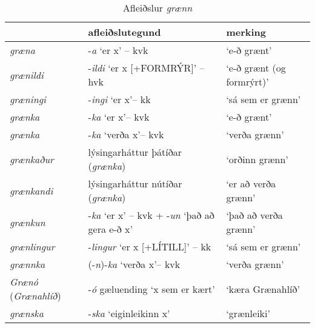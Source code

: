 \documentclass[../samsetningasafn.tex]{subfiles}
\begin{document}
\begin{table}[ht!]%
\begin{footnotesize}
\begin{tcolorbox}
	\begin{center}
	\begin{tabularx}{\textwidth}{Xll}
						&	\textbf{afleiðslutegund}					&	\textbf{merking}	\\
	\hline
	\textit{græna}			&	-\textit{a} \lq er x\rq{} -- kvk				&	\lq e-ð grænt\rq	\\
	\textit{grænildi}		&	-\textit{ildi} \lq er x [+FORMRÝR]\rq{} -- hvk	&	\lq e-ð grænt (og formrýrt)\rq		\\
	\textit{græningi}		&	-\textit{ingi} \lq er x\rq -- kk				&	\lq sá sem er grænn\rq	\\
	\textit{grænka}		&	-\textit{ka} \lq er x\rq -- kvk 				&	\lq e-ð grænt\rq	\\
	\textit{grænka}		&	-\textit{ka} \lq verða x\rq -- kvk 			&	\lq verða grænn\rq	\\
	\textit{grænkaður}		&	lýsingarháttur þátíðar (\textit{grænka})	&	\lq orðinn grænn\rq	\\
	\textit{grænkandi}		&	lýsingarháttur nútíðar (\textit{grænka})	&	\lq er að verða grænn\rq	\\
	\textit{grænkun}		&	-\textit{ka} \lq er x\rq{} -- kvk + -\textit{un} \lq það að gera e-ð x\rq	&	\lq það að verða grænn\rq	\\
	\textit{grænlingur}		&	-\textit{lingur} \lq er x [+LÍTILL]\rq{} -- kk	&	\lq sá sem er grænn\rq	\\
	\textit{grænnka}		&	(-\textit{n})-\textit{ka} \lq verða x\rq -- kvk 	&	\lq verða grænn\rq	\\
	\textit{Grænó} (\textit{Grænahlíð})	&	-\textit{ó} gæluending \lq x sem er kært\rq	&	\lq kæra Grænahlíð\rq \\
	\textit{grænska}		&	-\textit{ska} \lq eiginleikinn x\rq			&	\lq grænleiki\rq	\\
	\end{tabularx}
	\end{center}
\end{tcolorbox}
\end{footnotesize}
	\caption{Afleiðslur \textit{grænn}}
	\label{tafla:grafl}
\end{table}

\clearpage
\end{document}

